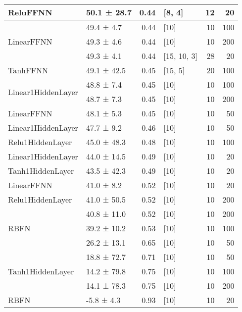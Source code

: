 \begin{longtable}{llrlrr}
ReluFFNN         & 50.1 ± 28.7 &  0.44 & [8, 4]         &         12 &       20 \\
 \hline
\multirow{3}{*}{LinearFFNN}         & 49.4 ± 4.7  &  0.44 & [10]           &         10 &      100 \\
         & 49.3 ± 4.6  &  0.44 & [10]           &         10 &      200 \\
         & 49.3 ± 4.1  &  0.44 & [15, 10, 3]    &         28 &       20 \\
 \hline
TanhFFNN         & 49.1 ± 42.5 &  0.45 & [15, 5]        &         20 &      100 \\
 \hline
\multirow{2}{*}{Linear1HiddenLayer}         & 48.8 ± 7.4  &  0.45 & [10]           &         10 &      100 \\
         & 48.7 ± 7.3  &  0.45 & [10]           &         10 &      200 \\
 \hline
LinearFFNN         & 48.1 ± 5.3  &  0.45 & [10]           &         10 &       50 \\
 \hline
Linear1HiddenLayer         & 47.7 ± 9.2  &  0.46 & [10]           &         10 &       50 \\
 \hline
Relu1HiddenLayer         & 45.0 ± 48.3 &  0.48 & [10]           &         10 &      100 \\
 \hline
Linear1HiddenLayer         & 44.0 ± 14.5 &  0.49 & [10]           &         10 &       20 \\
 \hline
Tanh1HiddenLayer         & 43.5 ± 42.3 &  0.49 & [10]           &         10 &       20 \\
 \hline
LinearFFNN         & 41.0 ± 8.2  &  0.52 & [10]           &         10 &       20 \\
 \hline
Relu1HiddenLayer         & 41.0 ± 50.5 &  0.52 & [10]           &         10 &      200 \\
 \hline
\multirow{3}{*}{RBFN}         & 40.8 ± 11.0 &  0.52 & [10]           &         10 &      200 \\
         & 39.2 ± 10.2 &  0.53 & [10]           &         10 &      100 \\
         & 26.2 ± 13.1 &  0.65 & [10]           &         10 &       50 \\
 \hline
\multirow{3}{*}{Tanh1HiddenLayer}         & 18.8 ± 72.7 &  0.71 & [10]           &         10 &       50 \\
         & 14.2 ± 79.8 &  0.75 & [10]           &         10 &      100 \\
         & 14.1 ± 78.3 &  0.75 & [10]           &         10 &      200 \\
 \hline
RBFN         & -5.8 ± 4.3  &  0.93 & [10]           &         10 &       20 \\
\hline
\end{longtable}
